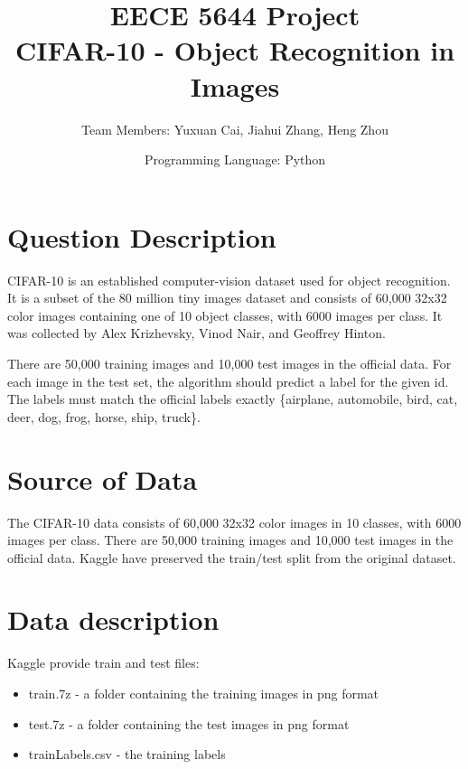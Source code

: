 \documentclass{article}
\begin{document}
\title{EECE 5644 Project\\CIFAR-10 - Object Recognition in Images}

\author{Team Members: Yuxuan Cai, Jiahui Zhang, Heng Zhou}
\date{Programming Language: Python}
\maketitle

\section{Question Description}

\hspace{1.5em}CIFAR-10  is an established computer-vision dataset used for object recognition. It is a subset of the 80 million tiny images dataset and consists of 60,000 32x32 color images containing one of 10 object classes, with 6000 images per class. It was collected by Alex Krizhevsky, Vinod Nair, and Geoffrey Hinton.

There are 50,000 training images and 10,000 test images in the official data. 
For each image in the test set, the algorithm should predict a label for the given id. The labels must match the official labels exactly \{airplane, automobile, bird, cat, deer, dog, frog, horse, ship, truck\}.

\section{Source of Data}
The CIFAR-10 data consists of 60,000 32x32 color images in 10 classes, with 6000 images per class. There are 50,000 training images and 10,000 test images in the official data. Kaggle have preserved the train/test split from the original dataset. 
\section{Data description}
Kaggle provide train and test files:
\begin{itemize}
    \item train.7z - a folder containing the training images in png format
    \item test.7z - a folder containing the test images in png format
    \item trainLabels.csv - the training labels
\end{itemize}
\end{document}
